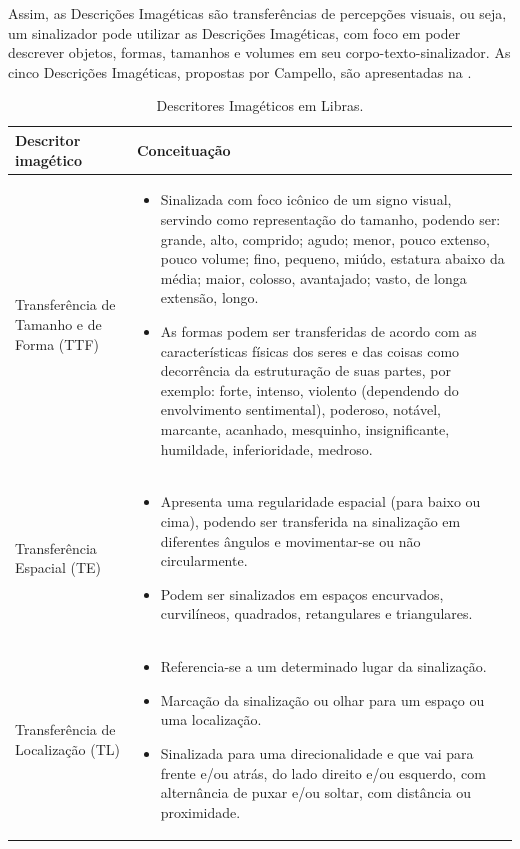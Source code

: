 \documentclass[portuguese]{textolivre}
\begin{document}
Assim, as Descrições Imagéticas são transferências de percepções visuais, ou seja, um sinalizador pode utilizar as Descrições Imagéticas, com foco em poder descrever objetos, formas, tamanhos e volumes em seu corpo-texto-sinalizador. As cinco Descrições Imagéticas, propostas por Campello, são apresentadas na .

\begin{table}[htbp]
\caption{Descritores Imagéticos em Libras.}
\label{tbl1}
\centering
\footnotesize
\begin{tabular}{p{4cm} p{10cm}}
\toprule
Descritor imagético & Conceituação \\ 
\midrule
Transferência de Tamanho e de Forma (TTF) & 
\begin{itemize}\vspace{-7pt}
    \item Sinalizada com foco icônico de um signo visual, servindo como representação do tamanho, podendo ser: grande, alto, comprido; agudo; menor, pouco extenso, pouco volume; fino, pequeno, miúdo, estatura abaixo da média; maior, colosso, avantajado; vasto, de longa extensão, longo.
    \item As formas podem ser transferidas de acordo com as características físicas dos seres e das coisas como decorrência da estruturação de suas partes, por exemplo: forte, intenso, violento (dependendo do envolvimento sentimental), poderoso, notável, marcante, acanhado, mesquinho, insignificante, humildade, inferioridade, medroso.
\end{itemize}  \\ 
Transferência Espacial (TE) & 
\begin{itemize}\vspace{-7pt}
    \item Apresenta uma regularidade espacial (para baixo ou cima), podendo ser transferida na sinalização em diferentes ângulos e movimentar-se ou não circularmente.
    \item Podem ser sinalizados em espaços encurvados, curvilíneos, quadrados, retangulares e triangulares.
\end{itemize} \\
Transferência de Localização (TL) & 
\begin{itemize}\vspace{-7pt}
    \item Referencia-se a um determinado lugar da sinalização. 
    \item Marcação da sinalização ou olhar para um espaço ou uma localização.
    \item Sinalizada para uma direcionalidade e que vai para frente e/ou atrás, do lado direito e/ou esquerdo, com alternância de puxar e/ou soltar, com distância ou proximidade.

\end{itemize}
\end{tabular}
\end{table}
\end{document}
